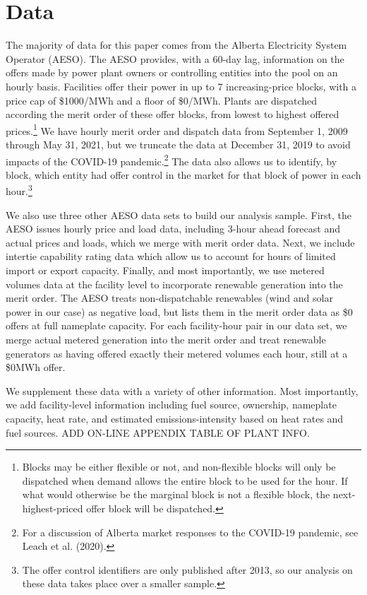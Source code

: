 \documentclass[12pt]{article}
\begin{document}
\section{Data}

The majority of data for this paper comes from the Alberta Electricity System Operator (AESO). The AESO provides, with a 60-day lag, information on the offers made by power plant owners or controlling entities into the pool on an hourly basis. Facilities offer their power in up to 7 increasing-price blocks, with a price cap of \$1000/MWh and a floor of \$0/MWh. Plants are dispatched according the merit order of these offer blocks, from lowest to highest offered prices.\footnote{Blocks may be either flexible or not, and non-flexible blocks will only be dispatched when demand allows the entire block to be used for the hour. If what would otherwise be the marginal block is not a flexible block, the next-highest-priced offer block will be dispatched.} We have hourly merit order and dispatch data from September 1, 2009 through May 31, 2021, but we truncate the data at December 31, 2019 to avoid impacts of the COVID-19 pandemic.\footnote{For a discussion of Alberta market responses to the COVID-19 pandemic, see Leach et al. (2020).} The data also allows us to identify, by block, which entity had offer control in the market for that block of power in each hour.\footnote{The offer control identifiers are only published after 2013, so our analysis on these data takes place over a smaller sample.}

We also use three other AESO data sets to build our analysis sample. First, the AESO issues hourly price and load data, including 3-hour ahead forecast and actual prices and loads, which we merge with merit order data. Next, we include intertie capability rating data which allow us to account for hours of limited import or export capacity. Finally, and most importantly, we use metered volumes data at the facility level to incorporate renewable generation into the merit order. The AESO treats non-dispatchable renewables (wind and solar power in our case) as negative load, but lists them in the merit order data as \$0 offers at full nameplate capacity. For each facility-hour pair in our data set, we merge actual metered generation into the merit order and treat renewable generators as having offered exactly their metered volumes each hour, still at a \$0MWh offer.

We supplement these data with a variety of other information.  Most importantly, we add facility-level information including fuel source, ownership, nameplate capacity, heat rate, and estimated emissions-intensity based on heat rates and fuel sources. ADD ON-LINE APPENDIX TABLE OF PLANT INFO.
\end{document}
